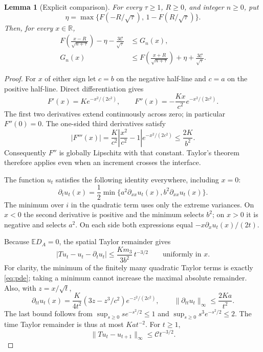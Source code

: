 \documentclass[11pt,a4paper]{article}
\newtheorem{lemma}[theorem]{Lemma}
\newcommand{\E}{\mathbb E}
\newcommand{\R}{\mathbb R}
\begin{document}
\begin{lemma}[Explicit comparison]\label{lem:comparison}
For every $\tau\ge1$, $R\ge0$, and integer $n\ge0$, put
\[
\eta=\max\{F(-R/\sqrt\tau),\,1-F(R/\sqrt\tau)\}.
\]
Then, for every $x\in\R$,
\begin{equation}\label{eq:barrier}
\boxed{\begin{aligned}
F\!\left(\frac{x-R}{\sqrt{n+\tau}}\right)
-\eta-\frac{3\mathcal C}{\sqrt\tau}
&\le G_n(x),\\
G_n(x)&\le
F\!\left(\frac{x+R}{\sqrt{n+\tau}}\right)
+\eta+\frac{3\mathcal C}{\sqrt\tau}.
\end{aligned}}
\end{equation}
\end{lemma}
\begin{proof}
For $x$ of either sign let $c=b$ on the negative half-line and $c=a$
on the positive half-line. Direct differentiation gives
\[
F'(x)=Ke^{-x^2/(2c^2)},\qquad
F''(x)=-\frac{Kx}{c^2}e^{-x^2/(2c^2)}.
\]
The first two derivatives extend continuously across zero; in particular
$F''(0)=0$. The one-sided third derivatives satisfy
\[
|F'''(x)|=\frac K{c^2}
\left|\frac{x^2}{c^2}-1\right|e^{-x^2/(2c^2)}
\le\frac{2K}{b^2}.
\]
Consequently $F''$ is globally Lipschitz with that constant. Taylor's
theorem therefore applies even when an increment crosses the interface.

The function $u_t$ satisfies the following identity everywhere,
including $x=0$:
\begin{equation}\label{eq:pde}
\partial_tu_t(x)
=\frac12\min\{a^2\partial_{xx}u_t(x),b^2\partial_{xx}u_t(x)\}.
\end{equation}
The minimum over $i$ in the quadratic term uses only the extreme
variances. On $x<0$ the second derivative is positive and the minimum selects
$b^2$; on $x>0$ it is negative and selects $a^2$. On each side both
expressions equal $-x\partial_xu_t(x)/(2t)$.

Because $\E D_A=0$, the spatial Taylor remainder gives
\[
\left|Tu_t-u_t-\partial_tu_t\right|
\le\frac{Km_3}{3b^2}\,t^{-3/2}
\qquad\text{uniformly in }x.
\]
For clarity, the minimum of the finitely many quadratic Taylor terms is exactly
\eqref{eq:pde}; taking a minimum cannot increase the maximal absolute
remainder. Also, with $z=x/\sqrt t$,
\[
\partial_{tt}u_t(x)
=\frac K{4t^2}(3z-z^3/c^2)e^{-z^2/(2c^2)},
\qquad \|\partial_{tt}u_t\|_\infty\le\frac{2Ka}{t^2}.
\]
The last bound follows from
$\sup_{s\ge0}se^{-s^2/2}\le1$ and
$\sup_{s\ge0}s^3e^{-s^2/2}\le2$.
The time Taylor remainder is thus at most $Ka t^{-2}$. For $t\ge1$,
\begin{equation}\label{eq:local}
\|Tu_t-u_{t+1}\|_\infty\le\mathcal C t^{-3/2}.
\end{equation}


\end{proof}
\end{document}
